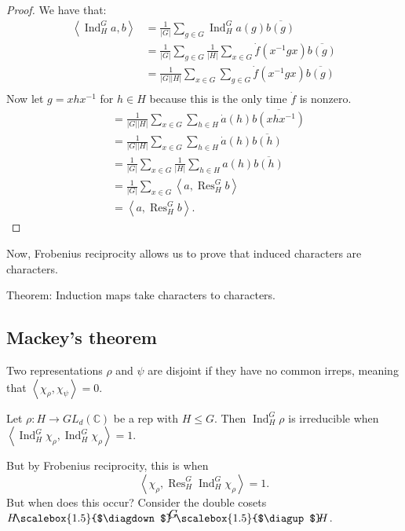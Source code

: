 \documentclass[]{report}
\theoremstyle{definition}
\numberwithin{theorem}{section}
\numberwithin{equation}{section}
\newcommand{\res}{\operatorname{Res}}
\newcommand{\ind}{\operatorname{Ind}}
\newcommand{\doublefaktor}[3]{%
	{\textstyle #1}
	\mkern-4mu\scalebox{1.5}{$\diagdown$}\mkern-5mu^{\textstyle #2}%
	\mkern-4mu\scalebox{1.5}{$\diagup$}\mkern-5mu{\textstyle #3} }
\begin{document}
\begin{proof}
	We have that:
	\begin{align*}
		\left\langle \ind^G_H a ,b \right\rangle &= 
		\frac{1}{|G|} \sum_{g \in G} \ind^G_H a(g) \overline{b(g)}\\
		&= \frac{1}{|G|} \sum_{g \in G} \frac{1}{|H|} \sum_{x \in G} \dot{f}(x^{-1} g x) \overline{b(g)}\\
		&= \frac{1}{|G||H|}\sum_{x \in G}\sum_{g \in G}   \dot{f}(x^{-1} g x) \overline{b(g)}\\
	\end{align*}
	Now let $g = x h x^{-1}$ for $h \in H$ because this is the only time $\dot{f}$ is nonzero.  
	\begin{align*}
		&= \frac{1}{|G||H|}\sum_{x \in G}\sum_{h \in H}   \dot{a}(h) \overline{b(x h x^{-1})}\\
		&= \frac{1}{|G||H|}\sum_{x \in G}\sum_{h \in H}   \dot{a}(h) \overline{b(h)}\\
		&= \frac{1}{|G|}\sum_{x \in G} \frac{1}{|H|}\sum_{h \in H}   a(h) \overline{b(h)}\\
		&= \frac{1}{|G|}\sum_{x \in G} \left\langle a, \res^G_H b \right\rangle\\
		&= \left\langle a, \res^G_H b \right\rangle.
	\end{align*}
\end{proof}
Now, Frobenius reciprocity allows us to prove that induced characters are characters. 

Theorem: Induction maps take characters to characters. 

\subsection{Mackey's theorem}

Two representations $\rho$ and $\psi$ are disjoint if they have no common irreps, meaning that $\left\langle \chi_\rho, \chi_\psi \right\rangle = 0$. 

Let $\rho: H \rightarrow GL_d(\mathbb{C})$ be a rep with $H \leq G$. Then $\ind^G_H \rho$ is irreducible when 
$\left\langle \ind^G_H \chi_\rho , \ind^G_H \chi_\rho \right \rangle = 1$. 

But by Frobenius reciprocity, this is when
\begin{equation}
	\left\langle \chi_\rho , \res^G_H \ind^G_H \chi_\rho \right \rangle = 1.
\end{equation}
But when does this occur?
Consider the double cosets $\doublefaktor{H}{G}{H}$.
\end{document}
